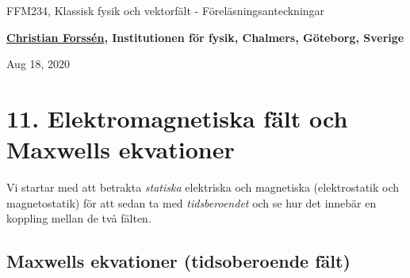 \documentclass[%
oneside,                 %
final,                   %
10pt]{article}
\begin{document}

\newcommand{\exercisesection}[1]{\subsection*{#1}}







\thispagestyle{empty}

\begin{center}
{\LARGE\bf
\begin{spacing}{1.25}
FFM234, Klassisk fysik och vektorfält - Föreläsningsanteckningar
\end{spacing}
}
\end{center}


\begin{center}
{\bf \href{{http://fy.chalmers.se/subatom/tsp/}}{Christian Forssén}, Institutionen för fysik, Chalmers, Göteborg, Sverige${}^{}$} \\ [0mm]
\end{center}

\begin{center}
\end{center}
    

\begin{center}
Aug 18, 2020
\end{center}

\vspace{1cm}


\section*{11. Elektromagnetiska fält och Maxwells ekvationer}

Vi startar med att betrakta \emph{statiska} elektriska och magnetiska (elektrostatik och magnetostatik) för att sedan ta med \emph{tidsberoendet} och se hur det innebär en koppling mellan de två fälten.

\subsection*{Maxwells ekvationer (tidsoberoende fält)}
\end{document}
